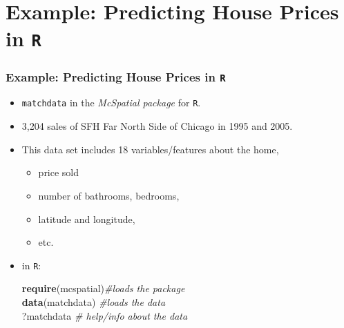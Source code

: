 \documentclass[
  shownotes,
  xcolor={svgnames},
  hyperref={colorlinks,citecolor=DarkBlue,linkcolor=DarkRed,urlcolor=DarkBlue}
  , aspectratio=169]{beamer}
\newenvironment{Shaded}{\begin{snugshade}}{\end{snugshade}}
\newcommand{\CommentTok}[1]{\textcolor[rgb]{0.56,0.35,0.01}{\textit{#1}}}
\newcommand{\KeywordTok}[1]{\textcolor[rgb]{0.13,0.29,0.53}{\textbf{#1}}}
\newcommand{\NormalTok}[1]{#1}
\begin{document}
\section{Example: Predicting House Prices in \texttt{R}}
\begin{frame}[fragile]
\frametitle{Example: Predicting House Prices in \texttt{R}}



    \begin{minipage}[t]{0.48\linewidth}

    \begin{itemize}
      \footnotesize
    \item  \texttt{matchdata}  in the
\emph{McSpatial package} for \texttt{R}. 
  \item  3,204 sales of SFH Far North Side of Chicago in 1995 and 2005. 
  \item This data set includes 18 variables/features about the home, 
  \begin{itemize}
    \tiny
    \item price sold
    \item number of bathrooms, bedrooms, 
    \item latitude and longitude,
    \item etc. 
  \end{itemize}
  \item  in \texttt{R}:
  \medskip
  
      \begin{Shaded}
      
        \footnotesize
        \KeywordTok{require}\NormalTok{(mcspatial)}\CommentTok{\tiny \#loads the package}    \\

          \KeywordTok{data}\NormalTok{(matchdata) }\CommentTok{\tiny \#loads the data}    \\

          \NormalTok{?matchdata }\CommentTok{\tiny \# help/info about  the data}    \\
      

\end{Shaded}
\end{itemize}
\end{minipage}
\end{frame}
\end{document}
